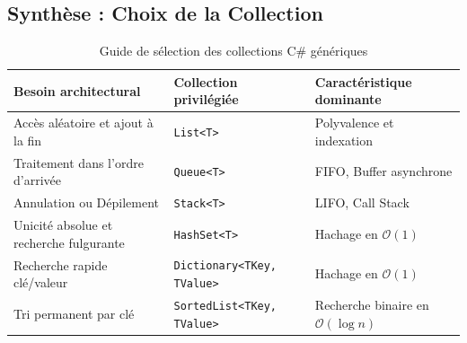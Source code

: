 \subsection{Synthèse : Choix de la Collection}

\begin{table}[h]
\centering
\renewcommand{\arraystretch}{1.3}
\begin{tabular}{|l|l|l|}
\hline
\textbf{Besoin architectural} & \textbf{Collection privilégiée} & \textbf{Caractéristique dominante} \\ \hline
Accès aléatoire et ajout à la fin & \texttt{List<T>} & Polyvalence et indexation \\ \hline
Traitement dans l'ordre d'arrivée & \texttt{Queue<T>} & FIFO, Buffer asynchrone \\ \hline
Annulation ou Dépilement & \texttt{Stack<T>} & LIFO, Call Stack \\ \hline
Unicité absolue et recherche fulgurante & \texttt{HashSet<T>} & Hachage en $\mathcal{O}(1)$ \\ \hline
Recherche rapide clé/valeur & \texttt{Dictionary<TKey, TValue>} & Hachage en $\mathcal{O}(1)$ \\ \hline
Tri permanent par clé & \texttt{SortedList<TKey, TValue>} & Recherche binaire en $\mathcal{O}(\log n)$ \\ \hline
\end{tabular}
\caption{Guide de sélection des collections C\# génériques}
\end{table}
